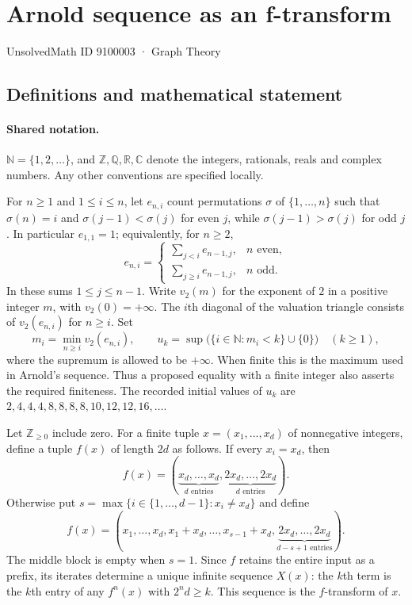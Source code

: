 \documentclass[11pt]{article}
\begin{document}
\setcounter{section}{9100002}
\section{Arnold sequence as an f-transform}\label{9100003}
{\small\sffamily UnsolvedMath ID 9100003 · Graph Theory}
\subsection{Definitions and mathematical statement}

\paragraph{Shared notation.}$\mathbb N=\{1,2,\ldots\}$, and $\mathbb Z,\mathbb Q,\mathbb R,\mathbb C$ denote the integers, rationals, reals and complex numbers. Any other conventions are specified locally.


For $n\ge1$ and $1\le i\le n$, let $e_{n,i}$ count permutations $\sigma$ of $\{1,\ldots,n\}$ such that $\sigma(n)=i$ and $\sigma(j-1)<\sigma(j)$ for even $j$, while $\sigma(j-1)>\sigma(j)$ for odd $j$. In particular $e_{1,1}=1$; equivalently, for $n\ge2$,
\[
e_{n,i}=\begin{cases}\sum_{j<i}e_{n-1,j},&n\text{ even},\\\sum_{j\ge i}e_{n-1,j},&n\text{ odd}.\end{cases}
\]
In these sums $1\le j\le n-1$. Write $v_2(m)$ for the exponent of $2$ in a positive integer $m$, with $v_2(0)=+\infty$. The $i$th diagonal of the valuation triangle consists of $v_2(e_{n,i})$ for $n\ge i$. Set
\[
m_i=\min_{n\ge i}v_2(e_{n,i}),\qquad
u_k=\sup\bigl(\{i\in\mathbb N:m_i<k\}\cup\{0\}\bigr)\quad(k\ge1),
\]
where the supremum is allowed to be $+\infty$. When finite this is the maximum used in Arnold's sequence. Thus a proposed equality with a finite integer also asserts the required finiteness. The recorded initial values of $u_k$ are $2,4,4,4,8,8,8,8,10,12,12,16,\ldots$.

Let $\mathbb Z_{\ge0}$ include zero. For a finite tuple $x=(x_1,\ldots,x_d)$ of nonnegative integers, define a tuple $f(x)$ of length $2d$ as follows. If every $x_i=x_d$, then
\[
f(x)=(\underbrace{x_d,\ldots,x_d}_{d\text{ entries}},\underbrace{2x_d,\ldots,2x_d}_{d\text{ entries}}).
\]
Otherwise put $s=\max\{i\in\{1,\ldots,d-1\}:x_i\ne x_d\}$ and define
\[
f(x)=(x_1,\ldots,x_d,x_1+x_d,\ldots,x_{s-1}+x_d,\underbrace{2x_d,\ldots,2x_d}_{d-s+1\text{ entries}}).
\]
The middle block is empty when $s=1$. Since $f$ retains the entire input as a prefix, its iterates determine a unique infinite sequence $X(x)$: the $k$th term is the $k$th entry of any $f^n(x)$ with $2^nd\ge k$. This sequence is the $f$-transform of $x$.
\end{document}
